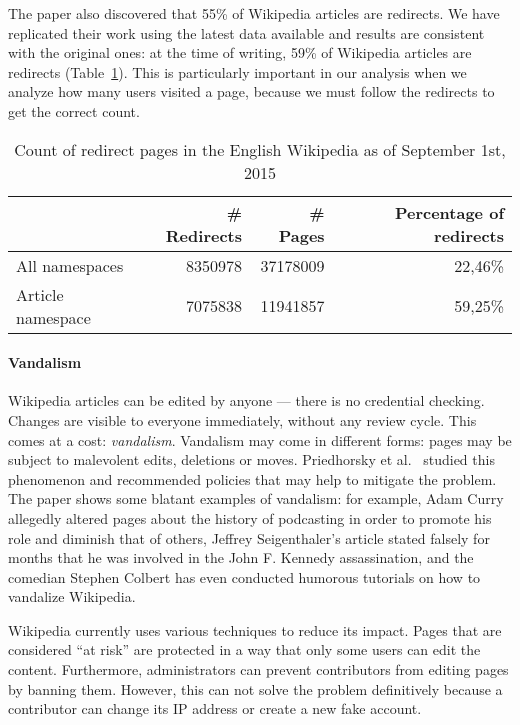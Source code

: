 The paper also discovered that 55\% of Wikipedia articles are redirects.
We have replicated their work using the latest data available and results are consistent with the original ones: at the time of writing, 59\% of Wikipedia articles are redirects (Table~\ref{tbl:redirects}).
This is particularly important in our analysis when we analyze how many users visited a page, because we must follow the redirects to get the correct count.

\begin{table}[t]
\centering
\begin{tabular}{@{}lrrr@{}}
\toprule
\multicolumn{1}{c}{\textbf{}} & \textbf{\# Redirects} & \textbf{\# Pages} & \textbf{Percentage of redirects} \\
\midrule
All namespaces    & 8350978                                & 37178009                               & 22,46\%             \\
Article namespace & 7075838                                & 11941857                               & 59,25\% \\
\bottomrule
\end{tabular}
\caption{Count of redirect pages in the English Wikipedia as of September 1st, 2015}
\label{tbl:redirects}
\end{table}

\paragraph{Vandalism}
Wikipedia articles can be edited by anyone --- there is no credential checking.
Changes are visible to everyone immediately, without any review cycle.
This comes at a cost: \emph{vandalism}.
Vandalism may come in different forms: pages may be subject to malevolent edits, deletions or moves.
Priedhorsky et al.~\cite{Priedhorsky2007} studied this phenomenon and recommended policies that may help to mitigate the problem.
The paper shows some blatant examples of vandalism: for example, Adam Curry allegedly altered pages about the history of podcasting in order to promote his role and diminish that of others, Jeffrey Seigenthaler's article stated falsely for months that he was involved in the John F. Kennedy assassination, and the comedian Stephen Colbert has even conducted humorous tutorials on how to vandalize Wikipedia.

Wikipedia currently uses various techniques to reduce its impact.
Pages that are considered ``at risk'' are protected in a way that only some users can edit the content.
Furthermore, administrators can prevent contributors from editing pages by banning them.
However, this can not solve the problem definitively because a contributor can change its IP address or create a new fake account.

